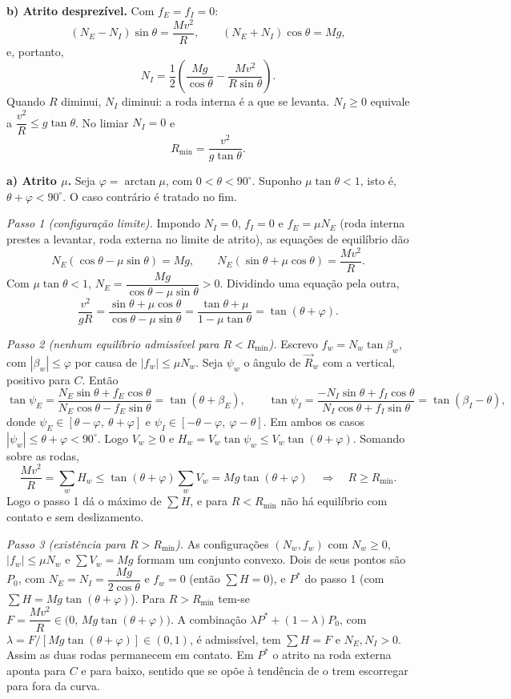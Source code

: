 \documentclass{article}%
\begin{document}
\textbf{b) Atrito desprezível.} Com $f_E=f_I=0$:
\[
(N_E-N_I)\sin\theta=\frac{Mv^2}{R},\qquad (N_E+N_I)\cos\theta=Mg,
\]
e, portanto,
\[
N_I=\frac12\left(\frac{Mg}{\cos\theta}-\frac{Mv^2}{R\sin\theta}\right).
\]
Quando $R$ diminui, $N_I$ diminui: a roda interna é a que se levanta. $N_I\ge 0$ equivale a $\dfrac{v^2}{R}\le g\tan\theta$. No limiar $N_I=0$ e
\[
R_{\min}=\frac{v^2}{g\tan\theta}.
\]

\textbf{a) Atrito $\mu$.} Seja $\varphi=\arctan\mu$, com $0<\theta<90^\circ$. Suponho $\mu\tan\theta<1$, isto é, $\theta+\varphi<90^\circ$. O caso contrário é tratado no fim.

\emph{Passo 1 (configuração limite).} Impondo $N_I=0$, $f_I=0$ e $f_E=\mu N_E$ (roda interna prestes a levantar, roda externa no limite de atrito), as equações de equilíbrio dão
\[
N_E(\cos\theta-\mu\sin\theta)=Mg,\qquad N_E(\sin\theta+\mu\cos\theta)=\frac{Mv^2}{R}.
\]
Com $\mu\tan\theta<1$, $N_E=\dfrac{Mg}{\cos\theta-\mu\sin\theta}>0$. Dividindo uma equação pela outra,
\[
\frac{v^2}{gR}=\frac{\sin\theta+\mu\cos\theta}{\cos\theta-\mu\sin\theta}=\frac{\tan\theta+\mu}{1-\mu\tan\theta}=\tan(\theta+\varphi).
\]

\emph{Passo 2 (nenhum equilíbrio admissível para $R<R_{\min}$).} Escrevo $f_w=N_w\tan\beta_w$, com $|\beta_w|\le\varphi$ por causa de $|f_w|\le\mu N_w$. Seja $\psi_w$ o ângulo de $\vec R_w$ com a vertical, positivo para $C$. Então
\[
\tan\psi_E=\frac{N_E\sin\theta+f_E\cos\theta}{N_E\cos\theta-f_E\sin\theta}=\tan(\theta+\beta_E),\qquad
\tan\psi_I=\frac{-N_I\sin\theta+f_I\cos\theta}{N_I\cos\theta+f_I\sin\theta}=\tan(\beta_I-\theta),
\]
donde $\psi_E\in[\theta-\varphi,\ \theta+\varphi]$ e $\psi_I\in[-\theta-\varphi,\ \varphi-\theta]$. Em ambos os casos $|\psi_w|\le\theta+\varphi<90^\circ$. Logo $V_w\ge 0$ e $H_w=V_w\tan\psi_w\le V_w\tan(\theta+\varphi)$. Somando sobre as rodas,
\[
\frac{Mv^2}{R}=\sum_w H_w\le\tan(\theta+\varphi)\sum_w V_w=Mg\tan(\theta+\varphi)\quad\Longrightarrow\quad R\ge R_{\min}.
\]
Logo o passo 1 dá o máximo de $\sum H$, e para $R<R_{\min}$ não há equilíbrio com contato e sem deslizamento.

\emph{Passo 3 (existência para $R>R_{\min}$).} As configurações $(N_w,f_w)$ com $N_w\ge 0$, $|f_w|\le\mu N_w$ e $\sum V_w=Mg$ formam um conjunto convexo. Dois de seus pontos são $P_0$, com $N_E=N_I=\dfrac{Mg}{2\cos\theta}$ e $f_w=0$ (então $\sum H=0$), e $P^*$ do passo 1 (com $\sum H=Mg\tan(\theta+\varphi)$). Para $R>R_{\min}$ tem-se $F=\dfrac{Mv^2}{R}\in\bigl(0,\,Mg\tan(\theta+\varphi)\bigr)$. A combinação $\lambda P^*+(1-\lambda)P_0$, com $\lambda=F/[Mg\tan(\theta+\varphi)]\in(0,1)$, é admissível, tem $\sum H=F$ e $N_E,N_I>0$. Assim as duas rodas permanecem em contato. Em $P^*$ o atrito na roda externa aponta para $C$ e para baixo, sentido que se opõe à tendência de o trem escorregar para fora da curva.
\end{document}
